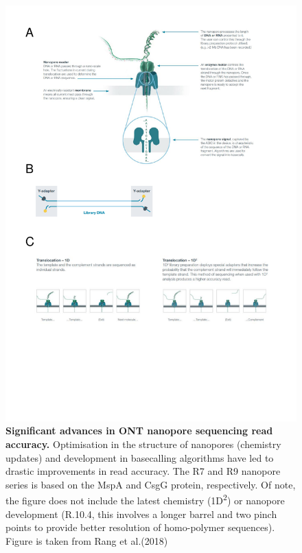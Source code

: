 \begin{figure}[h]
	\centering
	\includegraphics[page=2,trim={0 19cm 0 0},clip, scale = 0.8]{Figures/ProjectDevelopment_FiguresONT}
	\captionsetup{width=0.95\textwidth}
	\caption[Significant advances in ONT nanopore sequencing read accuracy]%
	{\textbf{Significant advances in ONT nanopore sequencing read accuracy.} Optimisation in the structure of nanopores (chemistry updates) and development in basecalling algorithms have led to drastic improvements in read accuracy. The R7 and R9 nanopore series is based on the MspA and CsgG protein, respectively. Of note, the figure does not include the latest chemistry (1D\textsuperscript{2}) or nanopore development (R.10.4, this involves a longer barrel and two pinch points to provide better resolution of homo-polymer sequences). Figure is taken from Rang et al.(2018)\cite{Rang2018}}
	\label{fig:ONT_advances}
\end{figure}

